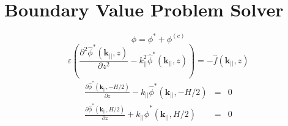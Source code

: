 \documentclass[ twoside,openright,titlepage,numbers=noenddot,%
headinclude,footinclude,cleardoublepage=empty,abstract=on,
BCOR=5mm,paper=a4,fontsize=11pt, dvipsnames
]{scrreprt}
\begin{document}
\section{Boundary Value Problem Solver}
\begin{equation}  \phi = \phi^* + \phi^{(c)}\end{equation}  
\begin{equation}
  \varepsilon  \left( \frac{\partial ^2 \hat{\phi}^*(\mathbf{k}_{||},z)}{\partial z^2} -k_{||}^2 \hat{\phi}^*(\mathbf{k}_{||},z)  \right) = -\hat{f}(\mathbf{k}_{||},z)
\end{equation}
\begin{eqnarray}
  \frac{\partial \hat{\phi}^*(\mathbf{k}_{||},-H/2)}{\partial z} -  k_{||} \hat{\phi}^*(\mathbf{k}_{||},-H/2)&=&0 \\
  \frac{\partial \hat{\phi}^*(\mathbf{k}_{||},H/2)}{\partial z}  +  k_{||} \hat{\phi}^*(\mathbf{k}_{||},H/2) &=&0
\label{eq:dppoisson_ewald}
\end{eqnarray}
\end{document}
